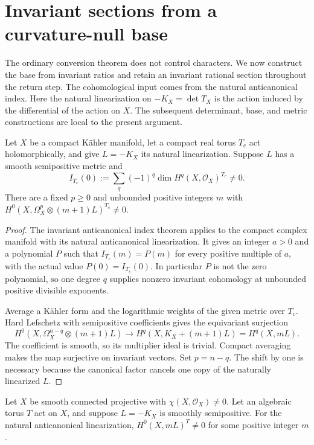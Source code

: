 \section{Invariant sections from a curvature-null base}
\label{inv:section}

The ordinary conversion theorem does not control characters.  We now
construct the base from invariant ratios and retain an invariant
rational section throughout the return step.  The cohomological input
comes from the natural anticanonical index.  Here the natural
linearization on $-K_X=\det T_X$ is the action induced by the
differential of the action on $X$.  The subsequent determinant,
base, and metric constructions are local to the present argument.

\begin{proposition}\label{inv:forms}
Let $X$ be a compact K\"ahler manifold, let a compact real torus $T_c$
act holomorphically, and give $L=-K_X$ its natural linearization.
Suppose $L$ has a smooth semipositive metric and
\[
 I_{T_c}(0):=\sum_q(-1)^q\dim H^q(X,\mathcal O_X)^{T_c}\ne0.
\]
There are a fixed $p\ge0$ and unbounded positive integers $m$ with
$H^0(X,\Omega_X^p\otimes(m+1)L)^{T_c}\ne0$.
\end{proposition}
\begin{proof}
The invariant anticanonical index theorem \cite[Theorem~1.1]{CompanionI}
applies to the compact
complex manifold with its natural anticanonical linearization.  It
gives an integer $a>0$ and a polynomial $P$ such that
$I_{T_c}(m)=P(m)$ for every positive multiple of $a$, with the actual
value $P(0)=I_{T_c}(0)$.  In particular $P$ is not the zero polynomial,
so one degree $q$ supplies nonzero invariant cohomology at unbounded
positive divisible exponents.

Average a K\"ahler form and the logarithmic weights of the given
metric over $T_c$.  Hard Lefschetz with semipositive coefficients
\cite[Theorem~0.1]{DPS2001} gives the equivariant surjection
\[
 H^0(X,\Omega_X^{n-q}\otimes(m+1)L)
 \longrightarrow H^q(X,K_X+(m+1)L)=H^q(X,mL).
\]
The coefficient is smooth, so its multiplier ideal is trivial.
Compact averaging makes the map surjective on invariant vectors.
Set $p=n-q$.  The shift by one is necessary because the canonical
factor cancels one copy of the naturally linearized $L$.
\end{proof}

\begin{theorem}\label{inv:nonvanishing}
Let $X$ be smooth connected projective with
$\chi(X,\mathcal O_X)\ne0$.  Let an algebraic torus $T$ act on $X$,
and suppose $L=-K_X$ is smoothly semipositive.  For the natural
anticanonical linearization,
$H^0(X,mL)^T\ne0$ for some positive integer $m$.
\end{theorem}

